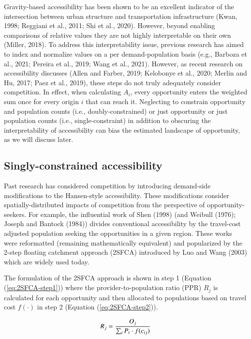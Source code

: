 \documentclass[]{elsarticle} %
\begin{document}
Gravity-based accessibility has been shown to be an excellent indicator
of the intersection between urban structure and transportation
infrastructure (Kwan, 1998; Reggiani et al., 2011; Shi et al., 2020).
However, beyond enabling comparisons of relative values they are not
highly interpretable on their own (Miller, 2018). To address this
interpretability issue, previous research has aimed to index and
normalize values on a per demand-population basis (e.g., Barboza et al.,
2021; Pereira et al., 2019; Wang et al., 2021). However, as recent
research on accessibility discusses (Allen and Farber, 2019; Kelobonye
et al., 2020; Merlin and Hu, 2017; Paez et al., 2019), these steps do
not truly adequately consider competition. In effect, when calculating
\(A_i\), every opportunity enters the weighted sum once for every origin
\(i\) that can reach it. Neglecting to constrain opportunity and
population counts (i.e., doubly-constrained) or just opportunity or just
population counts (i.e., single-constraint) in addition to obscuring the
interpretability of accessibility can bias the estimated landscape of
opportunity, as we will discuss later.

\hypertarget{singly-constrained-accessibility}{%
\subsection{Singly-constrained
accessibility}\label{singly-constrained-accessibility}}

Past research has considered competition by introducing demand-side
modifications to the Hansen-style accessibility. These modifications
consider spatially-distributed impacts of competition from the
perspective of opportunity-seekers. For example, the influential work of
Shen (1998) (and Weibull (1976); Joseph and Bantock (1984)) divides
conventional accessibility by the travel-cost adjusted population
seeking the opportunities in a given region. These works were
reformatted (remaining mathematically equivalent) and popularized by the
2-step floating catchment approach (2SFCA) introduced by Luo and Wang
(2003) which are widely used today.

The formulation of the 2SFCA approach is shown in step 1 (Equation
(\ref{eq:2SFCA-step1})) where the provider-to-population ratio (PPR)
\(R_j\) is calculated for each opportunity and then allocated to
populations based on travel cost \(f(\cdot)\) in step 2 (Equation
(\ref{eq:2SFCA-step2})).

\begin{equation}
\label{eq:2SFCA-step1}
R_{j} = \frac{O_{j}}{\sum_i P_{i} \cdot f(c_{ij})}\\
\end{equation}
\end{document}
